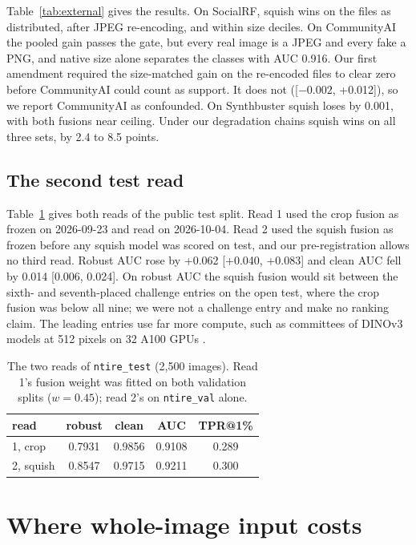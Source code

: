 \documentclass[letterpaper]{article} %
\begin{document}
Table~\ref{tab:external} gives the results. On SocialRF, squish wins on the
files as distributed, after JPEG re-encoding, and within size deciles. On
CommunityAI the pooled gain passes the gate, but every real image is a JPEG
and every fake a PNG, and native size alone separates the classes with AUC
0.916. Our first amendment required the size-matched gain on the re-encoded
files to clear zero before CommunityAI could count as support. It does not
([$-0.002$, +0.012]), so we report CommunityAI as confounded. On Synthbuster
squish loses by 0.001, with both fusions near ceiling. Under our degradation
chains squish wins on all three sets, by 2.4 to 8.5 points.

\subsection{The second test read}

Table~\ref{tab:test} gives both reads of the public test split. Read 1 used the
crop fusion as frozen on 2026-09-23 and read on 2026-10-04. Read 2 used the squish fusion as frozen
before any squish model was scored on test, and our pre-registration allows no
third read. Robust AUC rose by +0.062 [+0.040, +0.083] and clean AUC fell by
0.014 [0.006, 0.024]. On robust AUC the squish fusion would sit between the
sixth- and seventh-placed challenge entries on the open test, where the crop
fusion was below all nine; we were not a challenge entry and make no ranking
claim. The leading entries use far more compute, such as committees of DINOv3
models at 512 pixels on 32 A100 GPUs \cite{gushchin2026ntire}.

\begin{table}[t]
\centering
\small
\begin{tabular}{lcccc}
\toprule
read & robust & clean & AUC & TPR@1\% \\
\midrule
1, crop & 0.7931 & 0.9856 & 0.9108 & 0.289 \\
2, squish & 0.8547 & 0.9715 & 0.9211 & 0.300 \\
\bottomrule
\end{tabular}
\caption{The two reads of \texttt{ntire\_test} (2,500 images). Read 1's fusion
weight was fitted on both validation splits ($w = 0.45$); read 2's on
\texttt{ntire\_val} alone.}
\label{tab:test}
\end{table}

\section{Where whole-image input costs}
\label{sec:cost}
\end{document}
